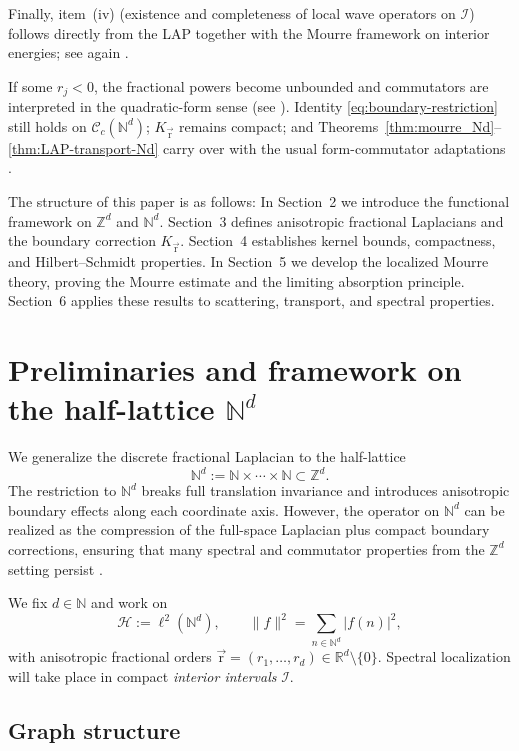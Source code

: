 \documentclass[10pt]{amsart}
\newcommand{\R}{{\mathbb{R}}}
\newcommand{\Z}{{\mathbb{Z}}}
\newcommand{\N}{{\mathbb{N}}}
\newcommand{\1}{{\mathbb{I}}}
\newcommand{\Ic}{\mathcal{I}}
\numberwithin{equation}{section}
\begin{document}
Finally, item~(iv) (existence and completeness of local wave operators on $\Ic$) follows directly
from the LAP together with the Mourre framework on interior energies; see again \cite[Ch.~7]{ABG}.



If some $r_j<0$, the fractional powers become unbounded and commutators are interpreted in the quadratic-form sense (see \cite{S,AF}).
Identity \eqref{eq:boundary-restriction} still holds on $\mathcal{C}_c(\mathbb{N}^d)$; $K_{\vec{\mathrm{r}}}$ remains compact; and Theorems~\ref{thm:mourre_Nd}--\ref{thm:LAP-transport-Nd} carry over with the usual form-commutator adaptations \cite{ABG}.



The structure of this paper is as follows:
In Section~2 we introduce the functional framework on $\Z^d$ and $\N^d$.
Section~3 defines anisotropic fractional Laplacians and the boundary correction $K_{\vec{\mathrm{r}}}$.
Section~4 establishes kernel bounds, compactness, and Hilbert--Schmidt properties.
In Section~5 we develop the localized Mourre theory, proving the Mourre estimate and the limiting absorption principle.
Section~6 applies these results to scattering, transport, and spectral properties.


\section{Preliminaries and framework on the half-lattice $\mathbb{N}^d$}
\label{sec:prelim}

We generalize the discrete fractional Laplacian to the half-lattice
\[
\N^d := \N \times \cdots \times \N \subset \Z^d.
\]
The restriction to $\N^d$ breaks full translation invariance and introduces anisotropic boundary effects along each coordinate axis. However, the operator on $\N^d$ can be realized as the compression of the full-space Laplacian plus compact boundary corrections, ensuring that many spectral and commutator properties from the $\Z^d$ setting persist \cite{Mic,AF,GG,AEG,AEG1}.

We fix $d\in\N$ and work on
\[
\mathcal{H} := \ell^2(\N^d), \qquad
\|f\|^2 = \sum_{n\in \N^d} |f(n)|^2,
\]
with anisotropic fractional orders $\vec{\mathrm{r}} = (r_1,\dots,r_d) \in \R^d\setminus\{0\}$. Spectral localization will take place in compact \emph{interior intervals} $\Ic$.

\subsection{Graph structure}
\end{document}
